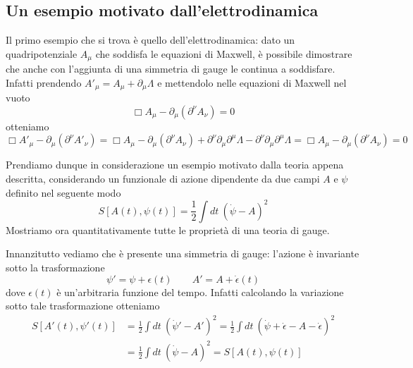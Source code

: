 \subsection{Un esempio motivato dall'elettrodinamica}

    Il primo esempio che si trova è quello dell'elettrodinamica: dato un quadripotenziale $A_\mu$ che soddisfa le equazioni di Maxwell, è possibile dimostrare che anche con l'aggiunta di una simmetria di gauge le continua a soddisfare. Infatti prendendo $A'_\mu = A_\mu + \partial_\mu \Lambda$ e mettendolo nelle equazioni di Maxwell nel vuoto
    \begin{equation*}
        \Box A_\mu - \partial_\mu (\partial^\nu A_\nu) = 0
    \end{equation*}
    otteniamo 
    \begin{equation*}
        \Box A'_\mu - \partial_\mu (\partial^\nu A'_\nu) = \Box A_\mu - \partial_\mu (\partial^\nu A_\nu) + \partial^\nu \partial_\mu \partial^\mu \Lambda - \partial^\nu \partial_\mu \partial^\mu \Lambda = \Box A_\mu - \partial_\mu (\partial^\nu A_\nu) = 0
    \end{equation*}

    Prendiamo dunque in considerazione un esempio motivato dalla teoria appena descritta, considerando un funzionale di azione dipendente da due campi $A$ e $\psi$ definito nel seguente modo
    \begin{equation*}
        S[A(t),\psi(t)] = \frac{1}{2} \int dt ~ (\dot \psi - A)^2
    \end{equation*}
    Mostriamo ora quantitativamente tutte le proprietà di una teoria di gauge. 
    
    Innanzitutto vediamo che è presente una simmetria di gauge: l'azione è invariante sotto la trasformazione
    \begin{equation}\label{arbitraria}
        \psi' = \psi + \epsilon(t) \qquad A' = A + \dot \epsilon(t)
    \end{equation}
    dove $\epsilon(t)$ è un'arbitraria funzione del tempo. Infatti calcolando la variazione sotto tale trasformazione otteniamo 
    \begin{equation*}
    \begin{aligned}
        S[A'(t),\psi'(t)] & = \frac{1}{2} \int dt ~ (\dot \psi' - A')^2 = \frac{1}{2} \int dt ~ (\dot \psi + \dot \epsilon - A - \dot \epsilon )^2 \\ & = \frac{1}{2} \int dt ~ (\dot \psi - A)^2 = S[A(t),\psi(t)]
    \end{aligned}
    \end{equation*}
    
